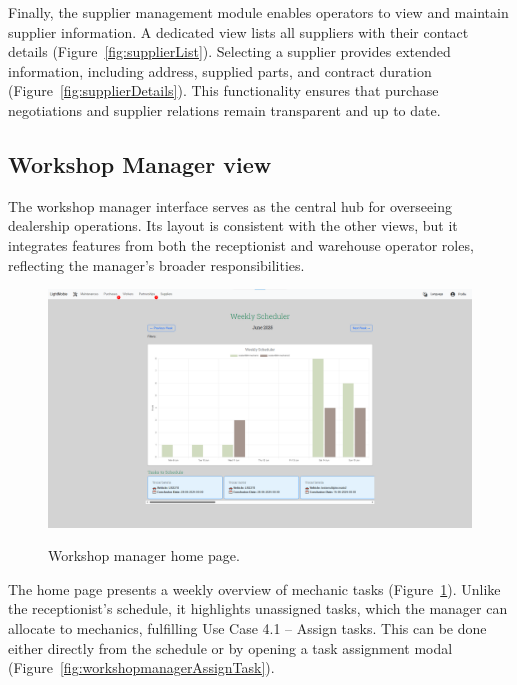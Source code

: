 Finally, the supplier management module enables operators to view and maintain supplier information. A dedicated view lists all suppliers with their contact details (Figure~\ref{fig:supplierList}). Selecting a supplier provides extended information, including address, supplied parts, and contract duration (Figure~\ref{fig:supplierDetails}). This functionality ensures that purchase negotiations and supplier relations remain transparent and up to date.

\subsection{Workshop Manager view}


The workshop manager interface serves as the central hub for overseeing dealership operations. Its layout is consistent with the other views, but it integrates features from both the receptionist and warehouse operator roles, reflecting the manager's broader responsibilities.


\begin{figure}[h]
  \caption{Workshop manager home page.}
  \centering
  \includegraphics[width=\textwidth]{figs/Implementation/workshopmanager/homePage}
  \label{fig:workshopmanagerHomePage}
\end{figure}



The home page presents a weekly overview of mechanic tasks (Figure~\ref{fig:workshopmanagerHomePage}). Unlike the receptionist's schedule, it highlights unassigned tasks, which the manager can allocate to mechanics, fulfilling Use Case 4.1 – Assign tasks. This can be done either directly from the schedule or by opening a task assignment modal (Figure~\ref{fig:workshopmanagerAssignTask}).






